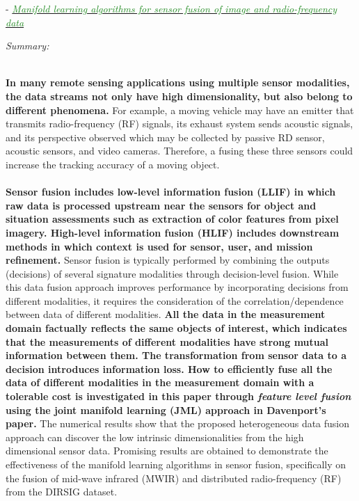 \documentclass[]{article}
\newcommand{\paperentry}[4]{
            \hangindent=1cm
            \textcolor{red}{\cite{#1}} - \href{run:../References/#3}{\textcolor{ForestGreen}{\textit{#2}}}
            
            \noindent            
            \begin{minipage}[t]{0.1\linewidth}\hfill\end{minipage}
            \begin{minipage}[t]{0.8\linewidth}\textcolor{NavyBlue}{{\textit{Summary:}}}#4\end{minipage}
            \vspace{.25cm}
          }
\begin{document}
		\paperentry{Shen2018ManifoldSensorFusionImageData}
		{Manifold learning algorithms for sensor fusion of image and radio-frequency data}
		{Manifold_Representation_Learning/Alignment/Shen2018ManifoldSensorFusionImageData.pdf}
		{} \\
		\textbf{In many remote sensing applications using multiple sensor modalities, the data streams not only have high dimensionality, but also belong  to different phenomena.}  For example, a moving vehicle may have an emitter that transmits radio-frequency (RF) signals,  its exhaust system sends acoustic signals, and its perspective observed which may be collected by passive RD sensor, acoustic sensors, and video cameras.  Therefore, a fusing these three sensors could increase the tracking accuracy of a moving object.
		\\ \\
		\textbf{Sensor fusion includes low-level information fusion (LLIF) in which raw data is processed upstream near the sensors for object and situation assessments such as extraction of color features from pixel imagery. High-level information fusion (HLIF) includes downstream methods in which context is used for sensor, user, and mission refinement.}  Sensor fusion is typically performed by combining the outputs (decisions) of several signature modalities through decision-level fusion.  While this data fusion approach improves performance by incorporating decisions from different modalities, it requires the consideration of the correlation/dependence between data of different modalities.  \textbf{All the data in the measurement domain factually reflects the same objects of interest, which indicates that the measurements of different modalities have strong mutual information between them.  The transformation from sensor data to a decision introduces information loss.  How to efficiently fuse all the data of different modalities in the measurement domain with a tolerable cost is investigated in this paper through \textit{feature level fusion} using the joint manifold learning (JML) approach  in Davenport's paper.}  The numerical results show that the proposed heterogeneous data fusion approach can discover the low intrinsic dimensionalities from the high dimensional sensor data.  Promising results are obtained to demonstrate  the effectiveness of the manifold learning algorithms in sensor fusion, specifically on the fusion of mid-wave infrared (MWIR) and distributed radio-frequency (RF) from the DIRSIG dataset. \\
		
\end{document}
